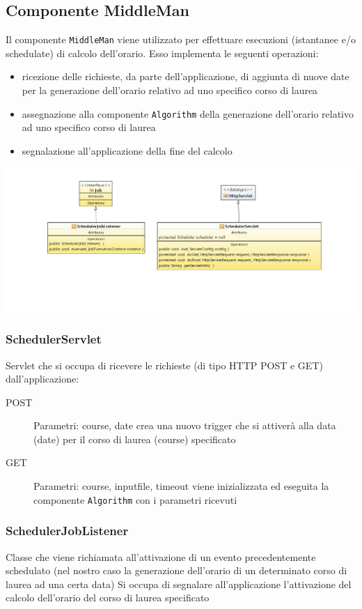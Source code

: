 \documentclass[11pt,a4paper]{article}
\begin{document}
\subsection{Componente MiddleMan}
Il componente \verb|MiddleMan| viene utilizzato per effettuare esecuzioni (istantanee e/o schedulate) di calcolo dell'orario. 
Esso implementa le seguenti operazioni:
\begin{itemize}
\item ricezione delle richieste, da parte dell'applicazione, di aggiunta di nuove date per la generazione dell'orario relativo ad uno specifico corso di laurea
\item assegnazione alla componente \verb|Algorithm| della generazione dell'orario relativo ad uno specifico corso di laurea
\item segnalazione all'applicazione della fine del calcolo 
\end{itemize}
\includegraphics[scale=0.34]{images/MMserv_diagram_class.png}
\subsubsection{SchedulerServlet}
Servlet che si occupa di ricevere le richieste (di tipo HTTP POST e GET) dall'applicazione:
\begin{description}
\item[POST] 
Parametri: course, date
crea una nuovo trigger che si attiverà alla data (date) per il corso di laurea (course) specificato 
\item[GET] 
Parametri: course, inputfile, timeout
viene inizializzata ed eseguita la componente \verb|Algorithm| con i parametri ricevuti
\end{description}
\subsubsection{SchedulerJobListener}
Classe che viene richiamata all'attivazione di un evento precedentemente schedulato (nel nostro caso la generazione dell'orario di un determinato corso di laurea ad una certa data)
Si occupa di segnalare all'applicazione l'attivazione del calcolo dell'orario del corso di laurea specificato  
\end{document}
